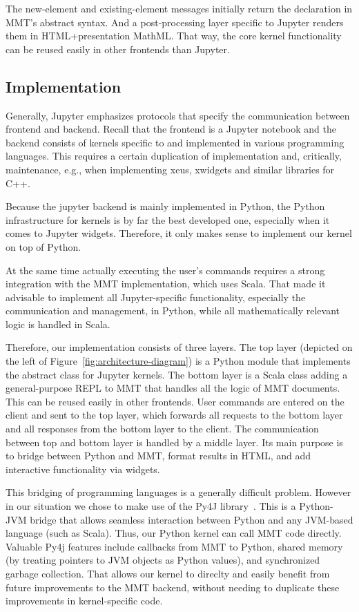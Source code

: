 The new-element and existing-element messages initially return the declaration in MMT's abstract syntax.
And a post-processing layer specific to Jupyter renders them in HTML+presentation MathML.
That way, the core kernel functionality can be reused easily in other frontends than Jupyter.

\subsection{Implementation}\label{sec:kernel:impl}

Generally, Jupyter emphasizes protocols that specify the communication between frontend and backend. 
Recall that the frontend is a Jupyter notebook and the backend consists of kernels specific to and implemented in various programming languages.
This requires a certain duplication of implementation and, critically, maintenance, e.g., when implementing xeus, xwidgets and similar libraries for C++.

Because the jupyter backend is mainly implemented in Python, the Python infrastructure for kernels is by far the best developed one, especially when it comes to Jupyter widgets. 
Therefore, it only makes sense to implement our kernel on top of Python.

At the same time actually executing the user's commands requires a strong integration with the MMT implementation, which uses Scala.
That made it advisable to implement all Jupyter-specific functionality, especially the communication and management, in Python, while all mathematically relevant logic is handled in Scala.

Therefore, our implementation consists of three layers.
The top layer (depicted on the left of Figure~\ref{fig:architecture-diagram}) is a Python module that implements the abstract class for Jupyter kernels.
The bottom layer is a Scala class adding a general-purpose REPL to MMT that handles all the logic of MMT documents.
This can be reused easily in other frontends.
User commands are entered on the client and sent to the top layer, which forwards all requests to the bottom layer and all responses from the bottom layer to the client.
The communication between top and bottom layer is handled by a middle layer.
Its main purpose is to bridge between Python and MMT, format results in HTML, and add interactive functionality via widgets.

This bridging of programming languages is a generally difficult problem. 
However in our situation we chose to make use of the Py4J library~\cite{Py4J:on}.
This is a Python-JVM bridge that allows seamless interaction between Python and any JVM-based language (such as Scala).
Thus, our Python kernel can call MMT code directly.
Valuable Py4j features include callbacks from MMT to Python, shared memory (by treating pointers to JVM objects as Python values), and synchronized garbage collection.
That allows our kernel to direclty and easily benefit from future improvements to the MMT backend, without needing to duplicate these improvements in kernel-specific code. 

